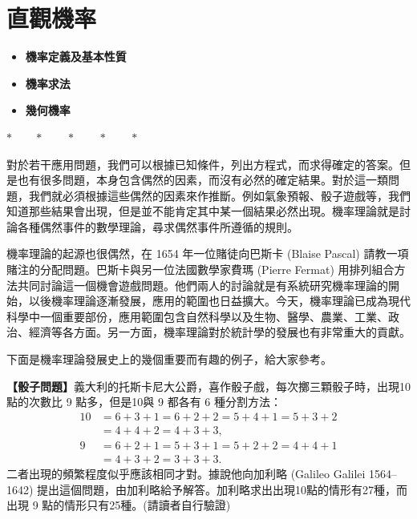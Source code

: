 \section{直觀機率}\label{sec:b5-ch3}

\begin{center}
\begin{minipage}{0.75\textwidth}
\begin{itemize}[leftmargin=2em, itemsep=0.3em]
  \item[§ III-1] \textbf{機率定義及基本性質}
  \item[§ III-2] \textbf{機率求法}
  \item[*§ III-3] \textbf{幾何機率}
\end{itemize}
\end{minipage}
\end{center}

\begin{center}
$* \qquad * \qquad * \qquad * \qquad *$
\end{center}

對於若干應用問題，我們可以根據已知條件，列出方程式，而求得確定的答案。但是也有很多問題，本身包含偶然的因素，而沒有必然的確定結果。對於這一類問題，我們就必須根據這些偶然的因素來作推斷。例如氣象預報、骰子遊戲等，我們知道那些結果會出現，但是並不能肯定其中某一個結果必然出現。機率理論就是討論各種偶然事件的數學理論，尋求偶然事件所遵循的規則。

機率理論的起源也很偶然，在 1654 年一位賭徒向巴斯卡 (Blaise Pascal) 請教一項賭注的分配問題。巴斯卡與另一位法國數學家費瑪 (Pierre Fermat) 用排列組合方法共同討論這一個機會遊戲問題。他們兩人的討論就是有系統研究機率理論的開始，以後機率理論逐漸發展，應用的範圍也日益擴大。今天，機率理論已成為現代科學中一個重要部份，應用範圍包含自然科學以及生物、醫學、農業、工業、政治、經濟等各方面。另一方面，機率理論對於統計學的發展也有非常重大的貢獻。

下面是機率理論發展史上的幾個重要而有趣的例子，給大家參考。

\medskip
\noindent\textbf{【骰子問題】}義大利的托斯卡尼大公爵，喜作骰子戲，每次擲三顆骰子時，出現10點的次數比 9 點多，但是10與 9 都各有 6 種分割方法：
\begin{align*}
10 &= 6 + 3 + 1 = 6 + 2 + 2 = 5 + 4 + 1 = 5 + 3 + 2 \\
   &= 4 + 4 + 2 = 4 + 3 + 3, \\
9  &= 6 + 2 + 1 = 5 + 3 + 1 = 5 + 2 + 2 = 4 + 4 + 1 \\
   &= 4 + 3 + 2 = 3 + 3 + 3.
\end{align*}
二者出現的頻繁程度似乎應該相同才對。據說他向加利略 (Galileo Galilei 1564--1642) 提出這個問題，由加利略給予解答。加利略求出出現10點的情形有27種，而出現 9 點的情形只有25種。(請讀者自行驗證)

